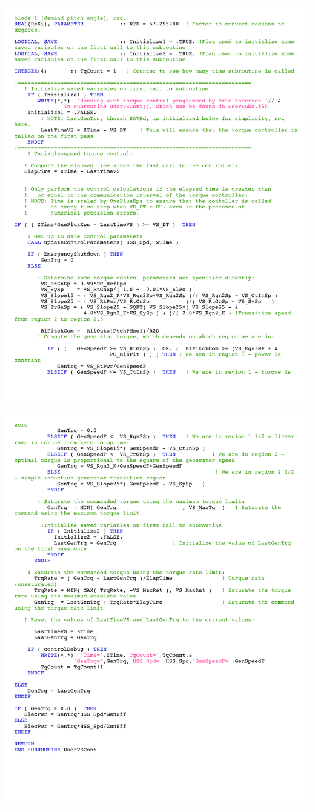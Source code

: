 \noindent
\includegraphics[width=\linewidth]{Figures/AppendixDFigures/figD-2C.pdf}

\noindent
\includegraphics[width=\linewidth]{Figures/AppendixDFigures/figD-2D.pdf}


